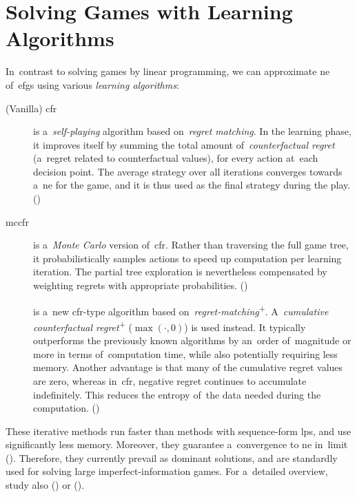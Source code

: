 \section{Solving Games with Learning Algorithms}
In~contrast to solving games by linear programming, we can approximate \acrlong{ne} of~\acrshort{efg}s using various \emph{learning algorithms}:
\begin{description}
  \item [(Vanilla) \acrfull{cfr}] is a~\emph{self-playing} algorithm based on~\emph{regret matching}.
    In the learning phase, it improves itself by summing the total amount of~\emph{counterfactual regret} (a~regret related to counterfactual values), for every action at~each decision point.
    The average strategy over all iterations converges towards a~\acrshort{ne} for the game, and it is thus used as the final strategy during the play.
    (\cite{Zinkevich2007regret})

  \item [\acrfull{mccfr}] is a~\emph{Monte Carlo} version of~\acrshort{cfr}.
    Rather than traversing the full game tree, it probabilistically samples actions to speed up computation per learning iteration.
    The partial tree exploration is nevertheless compensated by weighting regrets with appropriate probabilities.
    (\cite{Johanson2012efficient})

  \item [\cfrplus] is a~new \acrshort{cfr}-type algorithm based on~\emph{regret-matching}\textsuperscript{+}.
    A~\emph{cumulative counterfactual regret}\textsuperscript{+} ($\max(\cdot, 0)$) is used instead.
    It typically outperforms the previously known algorithms by an~order of~magnitude or more in terms of~computation time, while also potentially requiring less memory.
    Another advantage is that many of the cumulative regret values are zero, whereas in~\acrshort{cfr}, negative regret continues to accumulate indefinitely.
    This reduces the entropy of~the data needed during the computation. 
    (\cite{Tammelin2015solving})
\end{description}
These iterative methods run faster than methods with sequence-form \acrshort{lp}s, and use significantly less memory.
Moreover, they guarantee a~convergence to \acrlong{ne} in~limit (\cite[Theorem~4]{Zinkevich2007regret}).
Therefore, they currently prevail as dominant solutions, and are standardly used for solving large imperfect-information games.
For a~detailed overview, study also (\cite[Chapter~4]{AGT07}) or (\cite{Bosansky2013solving}).

